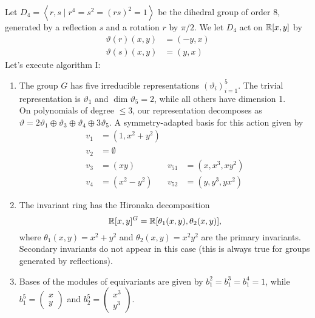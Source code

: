 \documentclass[]{article}
\begin{document}
Let $D_4=\left<r,s\mid r^4=s^2=(rs)^2=1\right>$ be the dihedral group of order $8$, generated by a reflection $s$ and a rotation $r$ by $\pi/2$. We let $D_4$ act on $\mathbb R[x,y]$ by 
\begin{align*}
    \vartheta(r)(x,y)&=(-y,x)\\
    \vartheta(s)(x,y)&=(y,x)
\end{align*}
Let's execute algorithm I:
\begin{enumerate}
    \item The group $G$ has five irreducible representations $(\vartheta_i)_{i=1}^5$. The trivial representation is $\vartheta_1$ and $\dim \vartheta_5=2$, while all others have dimension 1.\\
    On polynomials of degree $\leq3$, our representation decomposes as $\vartheta=2\vartheta_1\oplus\vartheta_3\oplus\vartheta_4\oplus3\vartheta_5$. A symmetry-adapted basis for this action given by   
    \begin{align*}
        v_1&=(1,x^2+y^2)&&\\
        v_2&=\emptyset&&\\
        v_3&=(xy) &   v_{51}&=(x,x^3,xy^2) \\
        v_4&=(x^2-y^2) &     v_{52}&=(y,y^3,yx^2)
    \end{align*}
    
    \item The invariant ring has the Hironaka decomposition
    \[
        \mathbb R[x,y]^G=\mathbb R[\theta_1(x,y),\theta_2(x,y)],
    \]
    where $\theta_1(x,y)=x^2+y^2$ and $\theta_2(x,y)=x^2y^2$ are the primary invariants. Secondary invariants do not appear in this case (this is always true for groups generated by reflections).\\ %
    
    \item Bases of the modules of equivariants are given by $b_1^2=b_1^3=b_1^4=1$, while $b_1^5=\begin{pmatrix}x\\y\end{pmatrix}$ and $b_2^5=\begin{pmatrix}x^3\\y^3\end{pmatrix}$.
    

\end{enumerate}
\end{document}

